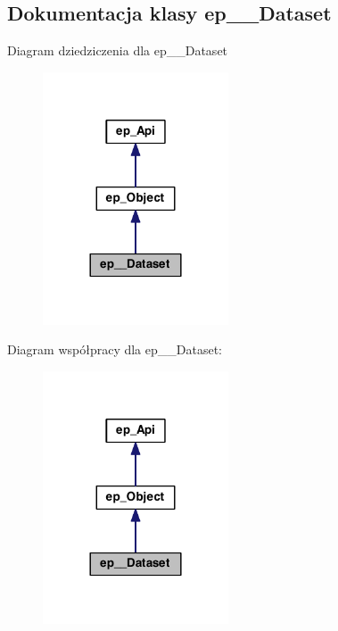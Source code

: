 \hypertarget{classep_____dataset}{\subsection{Dokumentacja klasy ep\-\_\-\-\_\-\-Dataset}
\label{classep_____dataset}
}


Diagram dziedziczenia dla ep\-\_\-\-\_\-\-Dataset\nopagebreak
\begin{figure}[H]
\begin{center}
\leavevmode
\includegraphics[width=156pt]{classep_____dataset__inherit__graph}
\end{center}
\end{figure}


Diagram współpracy dla ep\-\_\-\-\_\-\-Dataset\-:\nopagebreak
\begin{figure}[H]
\begin{center}
\leavevmode
\includegraphics[width=156pt]{classep_____dataset__coll__graph}
\end{center}
\end{figure}
